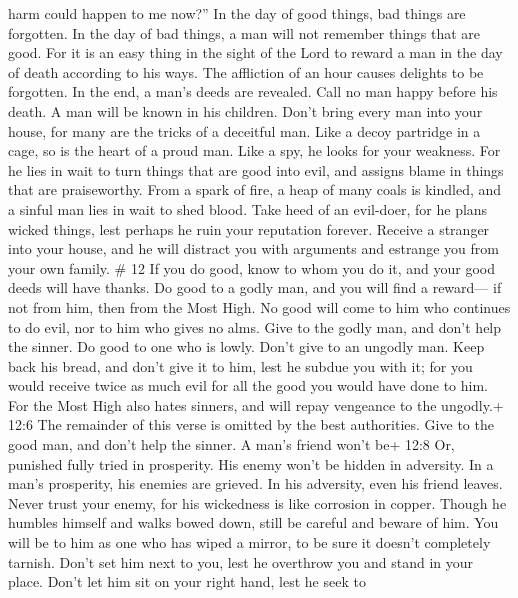 harm could happen to me now?''  In the day of good things,
bad things are forgotten. In the day of bad things, a man will not
remember things that are good.  For it is an easy thing in
the sight of the Lord to reward a man in the day of death according to
his ways.  The affliction of an hour causes delights to be
forgotten. In the end, a man's deeds are revealed.  Call no
man happy before his death. A man will be known in his children.
 Don't bring every man into your house, for many are the
tricks of a deceitful man.  Like a decoy partridge in a
cage, so is the heart of a proud man. Like a spy, he looks for your
weakness.  For he lies in wait to turn things that are good
into evil, and assigns blame in things that are praiseworthy.
 From a spark of fire, a heap of many coals is kindled, and
a sinful man lies in wait to shed blood.  Take heed of an
evil-doer, for he plans wicked things, lest perhaps he ruin your
reputation forever.  Receive a stranger into your house,
and he will distract you with arguments and estrange you from your own
family. \# 12  If you do good, know to whom you do it, and
your good deeds will have thanks.  Do good to a godly man,
and you will find a reward--- if not from him, then from the Most High.
 No good will come to him who continues to do evil, nor to
him who gives no alms.  Give to the godly man, and don't
help the sinner.  Do good to one who is lowly. Don't give to
an ungodly man. Keep back his bread, and don't give it to him, lest he
subdue you with it; for you would receive twice as much evil for all the
good you would have done to him.  For the Most High also
hates sinners, and will repay vengeance to the ungodly.+ 12:6 The
remainder of this verse is omitted by the best authorities. 
Give to the good man, and don't help the sinner.  A man's
friend won't be+ 12:8 Or, punished fully tried in prosperity. His enemy
won't be hidden in adversity.  In a man's prosperity, his
enemies are grieved. In his adversity, even his friend leaves.
 Never trust your enemy, for his wickedness is like
corrosion in copper.  Though he humbles himself and walks
bowed down, still be careful and beware of him. You will be to him as
one who has wiped a mirror, to be sure it doesn't completely tarnish.
 Don't set him next to you, lest he overthrow you and stand
in your place. Don't let him sit on your right hand, lest he seek to
